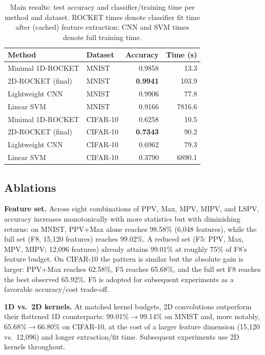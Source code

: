 \documentclass[a4paper,fleqn]{cas-sc}
\begin{document}
\begin{table}
\caption{Main results: test accuracy and classifier/training time per method and dataset. ROCKET times denote classifier fit time after (cached) feature extraction; CNN and SVM times denote full training time.}\label{tbl:main}
\begin{tabular*}{\tblwidth}{@{}llrr@{}}
\toprule
Method & Dataset & Accuracy & Time (s) \\
\midrule
Minimal 1D-ROCKET & MNIST     & 0.9858 & 13.3 \\
2D-ROCKET (final) & MNIST     & \textbf{0.9941} & 103.9 \\
Lightweight CNN    & MNIST     & 0.9906 & 77.8 \\
Linear SVM         & MNIST     & 0.9166 & 7816.6 \\
\midrule
Minimal 1D-ROCKET & CIFAR-10  & 0.6258 & 10.5 \\
2D-ROCKET (final) & CIFAR-10  & \textbf{0.7343} & 90.2 \\
Lightweight CNN    & CIFAR-10  & 0.6962 & 79.3 \\
Linear SVM         & CIFAR-10  & 0.3790 & 6890.1 \\
\bottomrule
\end{tabular*}
\end{table}

\subsection{Ablations}
\textbf{Feature set.} Across eight combinations of PPV, Max, MPV, MIPV, and LSPV, accuracy increases monotonically with more statistics but with diminishing returns: on MNIST, PPV+Max alone reaches 98.58\% (6{,}048 features), while the full set (F8, 15{,}120 features) reaches 99.02\%. A reduced set (F5: PPV, Max, MPV, MIPV; 12{,}096 features) already attains 99.01\% at roughly 75\% of F8's feature budget. On CIFAR-10 the pattern is similar but the absolute gain is larger: PPV+Max reaches 62.58\%, F5 reaches 65.68\%, and the full set F8 reaches the best observed 65.92\%. F5 is adopted for subsequent experiments as a favorable accuracy/cost trade-off.

\textbf{1D vs.\ 2D kernels.} At matched kernel budgets, 2D convolutions outperform their flattened 1D counterparts: 99.01\%$\to$99.14\% on MNIST and, more notably, 65.68\%$\to$66.80\% on CIFAR-10, at the cost of a larger feature dimension (15{,}120 vs.\ 12{,}096) and longer extraction/fit time. Subsequent experiments use 2D kernels throughout.
\end{document}
